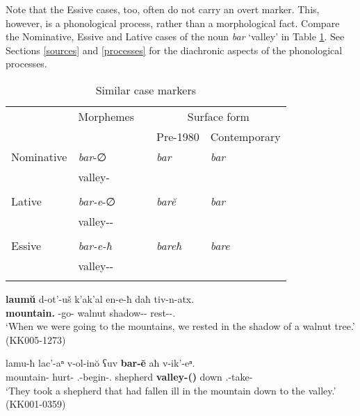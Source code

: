 Note that the Essive cases, too, often do not carry an overt marker. This, however, is a phonological process, rather than a morphological fact. Compare the Nominative, Essive and Lative cases of the noun \textit{bar} `valley' in Table \ref{table-essivelative}. See Sections \ref{sources} and \ref{processes} for the diachronic aspects of the phonological processes.


\begin{table}
	\begin{tabular}{lllll}
\lsptoprule
			& {Morphemes}	& 				& \multicolumn{2}{c}{{Surface form}}  \\
			&						&				& {Pre-1980} 	& {Contemporary} \\
                    \midrule
Nominative  & \textit{bar}-∅		& \rightarrow 	& \textit{bar}		 	& \textit{bar} \\
			& valley-{\Nom} 		& 				& 						& \\
			& 						& 				& 						& \\
Lative		& \textit{bar-e}-∅		& \rightarrow 	& \textit{bar\u{e}}		& \textit{bar} \\
			& valley-{\Obl}-{\Lat}	& 				& 						& \\ 
			& 						& 				& 						& \\
Essive	    & \textit{bar-e-ħ}		& \rightarrow 	& \textit{bareħ} 		& \textit{bare} \\
			& valley-{\Obl}-{\Ess}	& 				& 						& \\ 
	\lspbottomrule
    \end{tabular}
	\caption{Similar case markers}
	\label{table-essivelative}
\end{table}

\begin{exe}
	\ex\label{simplenp-ex37}
	\begin{xlist}
		
		\ex\label{simplenp-ex37a}
		\gll \textbf{laum\u{u}} d-ot'-uš k'ak'al en-e-ħ daħ tiv-n-atx. \\
		\textbf{mountain.{\Lat}} {\D}-go-{\Simul} walnut shadow-{\Obl}-{\Ess} {\Pv} rest-{\Aor}-{\Fpl}.{\Erg} \\
		\trans `When we were going to the mountains, we rested in the shadow of a walnut tree.'
		\hfill (KK005-1273)
		
		\ex\label{simplenp-ex37b}
		\gll lamu-ħ lac'-aⁿ v-ol-in\u{o} ʕuv \textbf{bar-\u{e}} aħ v-ik'-eⁿ. \\
		mountain-{\Ess} hurt-{\Inf} {\M}.{\Sg}-begin-{\Ptcp}.{\Aor} shepherd \textbf{valley-{\Obl}({\Lat})} down {\M}.{\Sg}-take-{\Aor} \\
		\trans `They took a shepherd that had fallen ill in the mountain down to the valley.'
		\hfill (KK001-0359)
		
	\end{xlist}
\end{exe}


